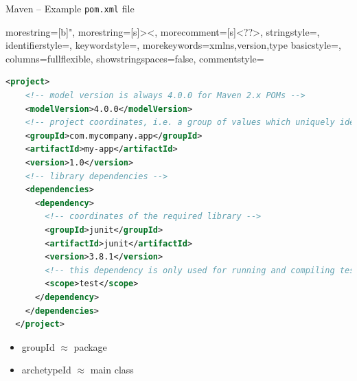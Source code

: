 \documentclass[English,c,%
hyperref={%
    pdftitle={FISA-DE2 OOP in Java},%
    pdfauthor={Muller, Gravier, Laforest, Subercaze},%
    pdfsubject={OOP in Java},%
    pdfkeywords={OOP, Java},%
    colorlinks=true,%
    urlcolor=blue,%
    linkcolor=%
    },%
xcolor={pdftex,svgnames} %
]{beamer}
\begin{document}
\begin{frame}[fragile]{Maven -- Example \texttt{pom.xml} file}

{
  morestring=[b]",
  morestring=[s]{>}{<},
  morecomment=[s]{<?}{?>},
  stringstyle=\color{black},
  identifierstyle=\color{darkblue},
  keywordstyle=\color{cyan},
  morekeywords={xmlns,version,type}%
  basicstyle=\ttfamily,
  columns=fullflexible,
  showstringspaces=false,
  commentstyle=\color{gray}\upshape
}

  \begin{lstlisting}[language=XML]
  <project>
    <!-- model version is always 4.0.0 for Maven 2.x POMs -->
    <modelVersion>4.0.0</modelVersion>
    <!-- project coordinates, i.e. a group of values which uniquely identify this project -->
    <groupId>com.mycompany.app</groupId>
    <artifactId>my-app</artifactId>
    <version>1.0</version>
    <!-- library dependencies -->
    <dependencies>
      <dependency>
        <!-- coordinates of the required library -->
        <groupId>junit</groupId>
        <artifactId>junit</artifactId>
        <version>3.8.1</version>
        <!-- this dependency is only used for running and compiling tests -->
        <scope>test</scope>
      </dependency>
    </dependencies>
  </project>
  \end{lstlisting}

  \begin{itemize}
    \bigskip
    \item groupId $\approx$ package
    \item archetypeId $\approx$ main class
\end{itemize}

\end{frame}
\end{document}

